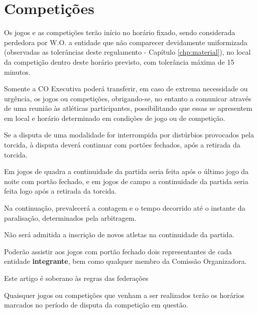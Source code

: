 {\let\clearpage\relax \chapter{Competições}}

\begin{article}
	Os jogos e as competições terão início no horário fixado, sendo considerada perdedora por W.O. a entidade que não comparecer devidamente uniformizada (observadas as tolerâncias deste regulamento - Capítulo \ref{chp:material}), no local da competição dentro deste horário previsto, com tolerância máxima de 15 minutos.
\end{article}

\begin{article}
	Somente a CO Executiva poderá transferir, em caso de extrema necessidade ou urgência, os jogos ou competições, obrigando-se, no entanto a comunicar através de uma reunião às atléticas participantes, possibilitando que essas se apresentem em local e horário determinado em condições de jogo ou de competição.
\end{article}

\begin{article}
	\label{art:jogos.interromp}
	Se a disputa de uma modalidade for interrompida por distúrbios provocados pela torcida, à disputa deverá continuar com portões fechados, após a retirada da torcida.

	\begin{xparagraph}
		Em jogos de quadra a continuidade da partida seria feita após o último jogo da noite com portão fechado, e em jogos de campo a continuidade da partida seria feita logo após a retirada da torcida.
	\end{xparagraph}

	\begin{xparagraph}
		Na continuação, prevalecerá a contagem e o tempo decorrido até o instante da paralisação, determinados pela arbitragem.
	\end{xparagraph}

	\begin{xparagraph}
		Não será admitida a inscrição de novos atletas na continuidade da partida.
	\end{xparagraph}

	\begin{xparagraph}
		Poderão assistir aos jogos com portão fechado dois representantes de cada entidade \textbf{integrante}, bem como qualquer membro da Comissão Organizadora.
	\end{xparagraph}

	\begin{xparagraph}
		Este artigo é soberano às regras das federações
	\end{xparagraph}
\end{article}

\begin{article}
	Quaisquer jogos ou competições que venham a ser realizados terão os horários marcados no período de disputa da competição em questão.
\end{article}
